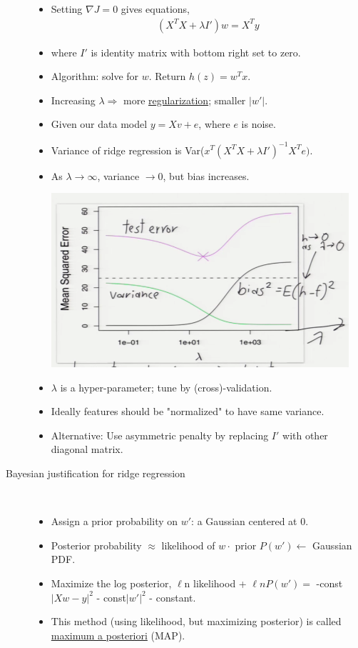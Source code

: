 \documentclass[10pt]{article}
\begin{document}
\begin{description}
\begin{itemize}
\begin{center}
			\end{center}
		\item Setting $\nabla J = 0$ gives equations,
			\begin{align*}
				(X^{T}X + \lambda I')w = X^{T}y
			\end{align*} 
		\item where $I'$ is identity matrix with bottom right set to zero.
		\item Algorithm: solve for $w$. Return $h(z) = w^{T}x$.
		\item Increasing $\lambda \Rightarrow$ more \underline{regularization}; smaller $|w'|$.
		\item Given our data model $y = Xv + e$, where $e$ is noise.
		\item Variance of ridge regression is Var($x^{T}(X^{T}X + \lambda I')^{-1}X^{T}e)$.
		\item As $\lambda \rightarrow \infty$, variance $\rightarrow 0$, but bias increases.
			\begin{center}
				\includegraphics[scale=0.5]{images/lambdabiasvsvariance}
			\end{center}
		\item $\lambda$ is a hyper-parameter; tune by (cross)-validation.
		\item Ideally features should be "normalized" to have same variance.
		\item Alternative: Use asymmetric penalty by replacing $I'$ with other diagonal matrix.
	\end{itemize} 
	
	\item[Bayesian justification for ridge regression]
	\
	\begin{itemize}
		\item Assign a prior probability on $w'$: a Gaussian centered at 0.
		\item Posterior probability $\approx$ likelihood of $w \cdot $ prior $P(w') \leftarrow$ Gaussian PDF. 
		\item Maximize the log posterior, $\ell$n likelihood + $\ell n P(w') =$ -const$|Xw-y|^{2}$ - const$|w'|^{2}$ - constant.
		\item This method (using likelihood, but maximizing posterior) is called \underline{maximum a posteriori} (MAP).
	\end{itemize}
	

\end{description}
\end{document}
